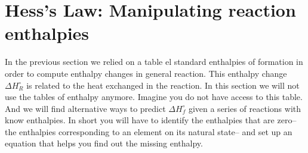 \documentclass[main.tex]{subfiles}
\begin{document}
 \section{Hess's Law: Manipulating reaction enthalpies }
In the previous section we relied on a table el standard enthalpies of formation in order to compute enthalpy changes in general reaction. This enthalpy change $\Delta H_R^{\circ}$ is related to the heat exchanged in the reaction. In this section we will not use the tables of enthalpy anymore. Imagine you do not have access to this table. And we will find alternative ways to predict $\Delta H_f^{\circ}$ given a series of reactions with know enthalpies. In short you will have to identify the enthalpies that are zero--the enthalpies corresponding to an element on its natural state-- and set up an equation that helps you find out the missing enthalpy. 
\sloppy
\end{document}
